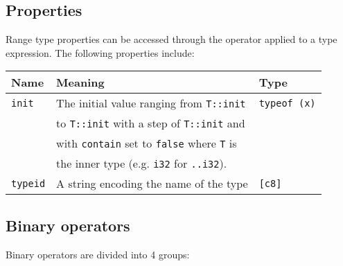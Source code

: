 \subsection {Properties}

Range type properties can be accessed through the operator \token{::} applied
to a type expression. The following properties include:

\begin{center}\begin{adjustbox}{max width=\linewidth}
  \begin{tabular}{|l|ll|}
    \hline
    Name & Meaning & Type\\
    \hline
    \hline
    \texttt{init} & The initial value ranging from \texttt{T::init} & \texttt{typeof (x)}\\
    & to \texttt{T::init} with a step of \texttt{T::init} and & \\
    & with \texttt{contain} set to \texttt{false} where \texttt{T} is & \\
    & the inner type (e.g. \texttt{i32} for \texttt{..i32}). &\\
    \hline
    \texttt{typeid} & A string encoding the name of the type & \texttt{[c8]} \\
    \hline
  \end{tabular}
\end{adjustbox}\end{center}


\subsection {Binary operators}

Binary operators are divided into 4 groups:

